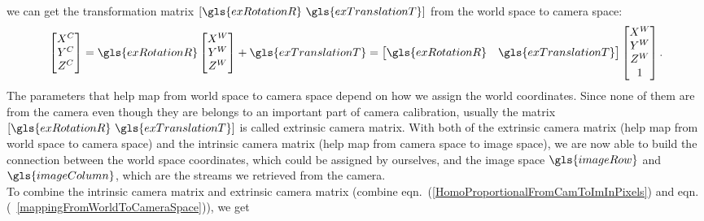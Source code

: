 %
we can get the transformation matrix \([\gls{exRotationR} \,\, \gls{exTranslationT}]\) from the world space to camera space:
%
\begin{equation}
\begin{bmatrix} 
X^{C} \\
Y^{C} \\
Z^{C}
 \end{bmatrix}%
=  \gls{exRotationR} \begin{bmatrix} 
X^{W} \\
Y^{W} \\
Z^{W}
 \end{bmatrix}%
 + \gls{exTranslationT}
=
\begin{bmatrix} 
\gls{exRotationR} & \gls{exTranslationT} \\
\end{bmatrix}%
 \begin{bmatrix} 
X^{W} \\
Y^{W} \\
Z^{W} \\
1
 \end{bmatrix}  .%
\label{mappingFromWorldToCameraSpace}
\end{equation}%
%
%
\noindent
The parameters that help map from world space to camera space depend on how we assign the world coordinates. Since none of them are from the camera even though they are belongs to an important part of camera calibration, usually the matrix \([\gls{exRotationR} \,\, \gls{exTranslationT}]\) is called extrinsic camera matrix. With both of the extrinsic camera matrix (help map from world space to camera space) and the intrinsic camera matrix (help map from camera space to image space), we are now able to build the connection between the world space coordinates, which could be assigned by ourselves, and the image space \(\gls{imageRow}\) and \(\gls{imageColumn}\), which are the streams we retrieved from the camera. 
\\\indent
To combine the intrinsic camera matrix and extrinsic camera matrix (combine eqn.~(\ref{HomoProportionalFromCamToImInPixels}) and eqn.(~\ref{mappingFromWorldToCameraSpace})), we get 

